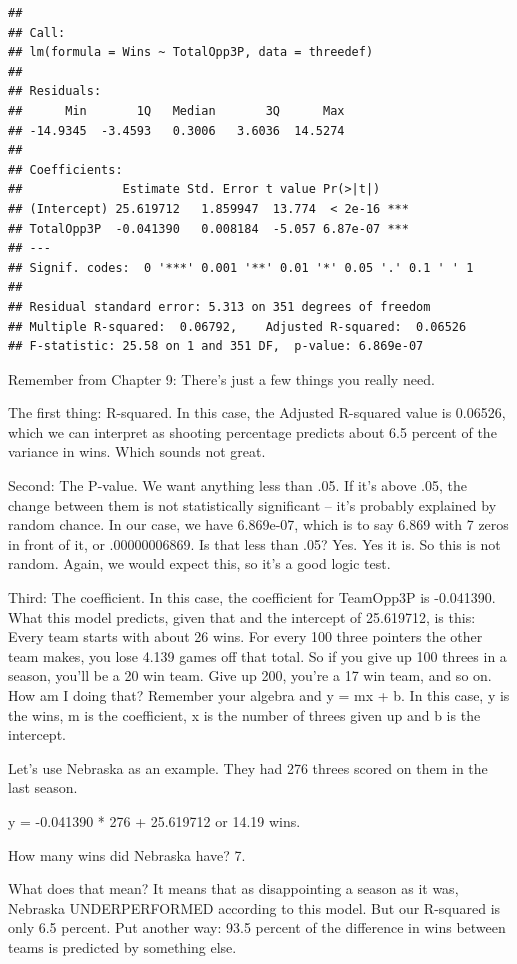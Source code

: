 \documentclass[
]{book}
\begin{document}
\begin{verbatim}
## 
## Call:
## lm(formula = Wins ~ TotalOpp3P, data = threedef)
## 
## Residuals:
##      Min       1Q   Median       3Q      Max 
## -14.9345  -3.4593   0.3006   3.6036  14.5274 
## 
## Coefficients:
##              Estimate Std. Error t value Pr(>|t|)    
## (Intercept) 25.619712   1.859947  13.774  < 2e-16 ***
## TotalOpp3P  -0.041390   0.008184  -5.057 6.87e-07 ***
## ---
## Signif. codes:  0 '***' 0.001 '**' 0.01 '*' 0.05 '.' 0.1 ' ' 1
## 
## Residual standard error: 5.313 on 351 degrees of freedom
## Multiple R-squared:  0.06792,    Adjusted R-squared:  0.06526 
## F-statistic: 25.58 on 1 and 351 DF,  p-value: 6.869e-07
\end{verbatim}

Remember from Chapter 9: There's just a few things you really need.

The first thing: R-squared. In this case, the Adjusted R-squared value is 0.06526, which we can interpret as shooting percentage predicts about 6.5 percent of the variance in wins. Which sounds not great.

Second: The P-value. We want anything less than .05. If it's above .05, the change between them is not statistically significant -- it's probably explained by random chance. In our case, we have 6.869e-07, which is to say 6.869 with 7 zeros in front of it, or .00000006869. Is that less than .05? Yes. Yes it is. So this is not random. Again, we would expect this, so it's a good logic test.

Third: The coefficient. In this case, the coefficient for TeamOpp3P is -0.041390. What this model predicts, given that and the intercept of 25.619712, is this: Every team starts with about 26 wins. For every 100 three pointers the other team makes, you lose 4.139 games off that total. So if you give up 100 threes in a season, you'll be a 20 win team. Give up 200, you're a 17 win team, and so on. How am I doing that? Remember your algebra and y = mx + b. In this case, y is the wins, m is the coefficient, x is the number of threes given up and b is the intercept.

Let's use Nebraska as an example. They had 276 threes scored on them in the last season.

y = -0.041390 * 276 + 25.619712 or 14.19 wins.

How many wins did Nebraska have? 7.

What does that mean? It means that as disappointing a season as it was, Nebraska UNDERPERFORMED according to this model. But our R-squared is only 6.5 percent. Put another way: 93.5 percent of the difference in wins between teams is predicted by something else.
\end{document}

